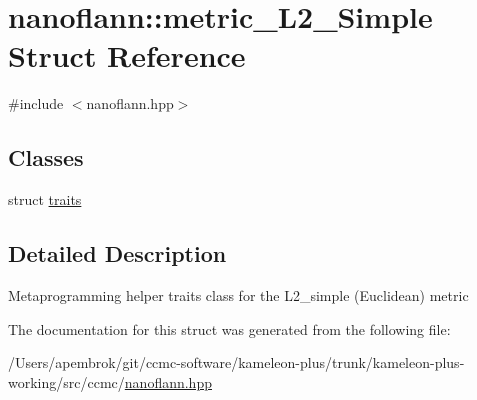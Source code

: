 \hypertarget{structnanoflann_1_1metric___l2___simple}{\section{nanoflann\-:\-:metric\-\_\-\-L2\-\_\-\-Simple Struct Reference}
\label{structnanoflann_1_1metric___l2___simple}
}


{\ttfamily \#include $<$nanoflann.\-hpp$>$}

\subsection*{Classes}
\begin{DoxyCompactItemize}
\item 
struct \hyperlink{structnanoflann_1_1metric___l2___simple_1_1traits}{traits}
\end{DoxyCompactItemize}


\subsection{Detailed Description}
Metaprogramming helper traits class for the L2\-\_\-simple (Euclidean) metric 

The documentation for this struct was generated from the following file\-:\begin{DoxyCompactItemize}
\item 
/\-Users/apembrok/git/ccmc-\/software/kameleon-\/plus/trunk/kameleon-\/plus-\/working/src/ccmc/\hyperlink{nanoflann_8hpp}{nanoflann.\-hpp}\end{DoxyCompactItemize}
